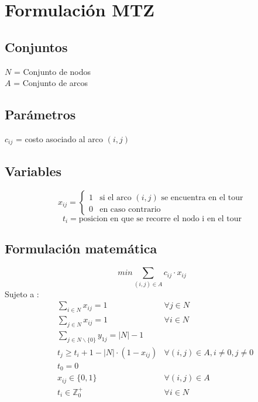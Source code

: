 \documentclass[5p]{article}
\begin{document}
\section{Formulación MTZ}
\subsection{Conjuntos}
$N$ = Conjunto de nodos\\
$A$ = Conjunto de arcos
\subsection{Parámetros}
$c_{ij}$ = costo asociado al arco $(i,j)$
\subsection{Variables}
\begin{flushleft}
\[x_{ij}={\begin{cases}1&{\mbox{si el arco $(i,j)$ se encuentra en el tour}}\\0&{\mbox{en caso contrario}}\end{cases}}
\]
\[t_{i} = \mbox{posicion en que se recorre el nodo i en el tour}\]
\end{flushleft}
\subsection{Formulación matemática}
\begin{equation}
min \sum_{(i,j) \in A} c_{ij} \cdot x_{ij}
\end{equation}
Sujeto a : \begin{align}
& \sum_{i \in N} x_{ij} = 1 &\forall j \in N \\
& \sum_{j \in N} x_{ij} = 1 &\forall i \in N \\
& \sum_{j \in N \backslash \{0\}} y_{1j} = |N| - 	1 \\
& t_{j} \geq t_{i} + 1 - |N| \cdot (1 - x_{ij}) & \forall (i,j) \in A, i \neq 0, j \neq 0\\
& t_{0} = 0\\
& x_{ij} \in \{0,1\} &\forall (i,j) \in A\\
& t_{i} \in \mathbb{Z}^{+}_{0} &\forall i \in N
\end{align}
\end{document}
